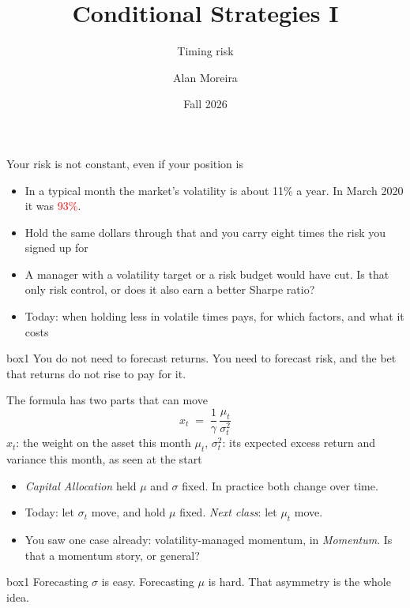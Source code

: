 \documentclass[aspectratio=169,10pt]{beamer}
\title{Conditional Strategies I}
\subtitle{Timing risk}
\author[A. Moreira]{Alan Moreira}
\institute[Data-Driven Investing]{NYU Stern --- Data-Driven Investing}
\date{Fall 2026}
\begin{document}
\begin{frame}
\titlepage
\end{frame}

\begin{frame}{Your risk is not constant, even if your position is}
\vskip 6pt
\begin{itemize}
\item In a typical month the market's volatility is about 11\% a year. In March 2020 it was \textcolor{red}{93\%}.
\vskip 8pt
\item Hold the same dollars through that and you carry eight times the risk you signed up for
\vskip 8pt
\item A manager with a volatility target or a risk budget would have cut. Is that only risk control, or does it also earn a better Sharpe ratio?
\vskip 8pt
\item Today: when holding less in volatile times pays, for which factors, and what it costs
\end{itemize}
\vskip 14pt
\begin{beamercolorbox}[rounded=true,sep=7pt,center]{box1}
You do not need to forecast returns. You need to forecast risk, and the bet that returns do not rise to pay for it.
\end{beamercolorbox}
\end{frame}

\begin{frame}{The formula has two parts that can move}
\[ x_{t} \;=\; \frac{1}{\gamma}\,\frac{\mu_{t}}{\sigma_{t}^{2}} \]
{\small $x_{t}$: the weight on the asset this month \quad $\mu_{t}$, $\sigma_{t}^{2}$: its expected excess return and variance this month, as seen at the start}
\vskip 6pt
\begin{itemize}
\item \emph{Capital Allocation} held $\mu$ and $\sigma$ fixed. In practice both change over time.
\vskip 6pt
\item Today: let $\sigma_{t}$ move, and hold $\mu$ fixed. \emph{Next class}: let $\mu_{t}$ move.
\vskip 6pt
\item You saw one case already: volatility-managed momentum, in \emph{Momentum}. Is that a momentum story, or general?
\end{itemize}
\vskip 10pt
\begin{beamercolorbox}[rounded=true,sep=7pt,center]{box1}
Forecasting $\sigma$ is easy. Forecasting $\mu$ is hard. That asymmetry is the whole idea.
\end{beamercolorbox}
\end{frame}
\end{document}
